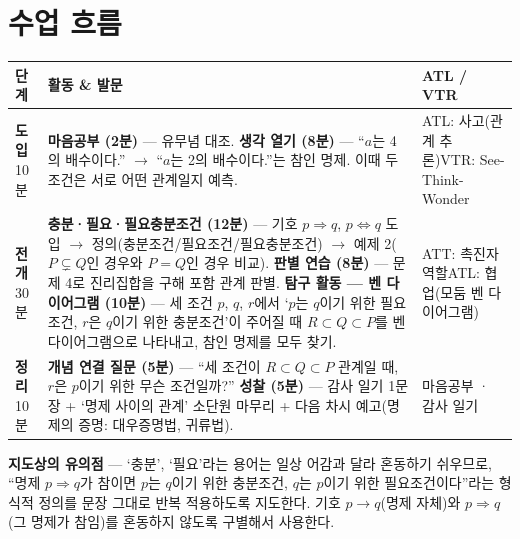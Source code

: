 \documentclass[11pt,a4paper]{article}
\begin{document}
\section{수업 흐름}
\begin{tabularx}{\linewidth}{@{}>{\centering\arraybackslash}p{1.6cm}X>{\raggedright\arraybackslash\small}p{3.1cm}@{}}
\toprule
\textbf{단계} & \textbf{활동 \& 발문} & \textbf{ATL / VTR} \\
\midrule
\textcolor{goldstrong}{\textbf{도입}}\newline\footnotesize 10분 &
\textbf{마음공부 (2분)} --- 유무념 대조.\newline
\textbf{생각 열기 (8분)} --- ``$a$는 4의 배수이다.'' $\to$ ``$a$는 2의 배수이다.''는 참인 명제. 이때 두 조건은 서로 어떤 관계일지 예측. &
ATL: 사고(관계 추론)\newline VTR: See-Think-Wonder \\
\addlinespace
\textcolor{goldstrong}{\textbf{전개}}\newline\footnotesize 30분 &
\textbf{충분·필요·필요충분조건 (12분)} --- 기호 $p\Rightarrow q$, $p\Leftrightarrow q$ 도입 $\to$ 정의(충분조건/필요조건/필요충분조건) $\to$ 예제 2($P\subsetneq Q$인 경우와 $P=Q$인 경우 비교).\newline
\textbf{판별 연습 (8분)} --- 문제 4로 진리집합을 구해 포함 관계 판별.\newline
\textbf{탐구 활동 --- 벤 다이어그램 (10분)} --- 세 조건 $p$, $q$, $r$에서 `$p$는 $q$이기 위한 필요조건, $r$은 $q$이기 위한 충분조건'이 주어질 때 $R\subset Q\subset P$를 벤 다이어그램으로 나타내고, 참인 명제를 모두 찾기. &
ATT: 촉진자 역할\newline ATL: 협업(모둠 벤 다이어그램) \\
\addlinespace
\textcolor{goldstrong}{\textbf{정리}}\newline\footnotesize 10분 &
\textbf{개념 연결 질문 (5분)} --- ``세 조건이 $R\subset Q\subset P$ 관계일 때, $r$은 $p$이기 위한 무슨 조건일까?''\newline
\textbf{성찰 (5분)} --- 감사 일기 1문장 + `명제 사이의 관계' 소단원 마무리 + 다음 차시 예고(명제의 증명: 대우증명법, 귀류법). &
마음공부 · 감사 일기 \\
\bottomrule
\end{tabularx}

\begin{calloutbox}
\textbf{지도상의 유의점} --- `충분', `필요'라는 용어는 일상 어감과 달라 혼동하기 쉬우므로, ``명제 $p\Rightarrow q$가 참이면 $p$는 $q$이기 위한 충분조건, $q$는 $p$이기 위한 필요조건이다''라는 형식적 정의를 문장 그대로 반복 적용하도록 지도한다. 기호 $p\to q$(명제 자체)와 $p\Rightarrow q$(그 명제가 참임)를 혼동하지 않도록 구별해서 사용한다.
\end{calloutbox}
\end{document}
